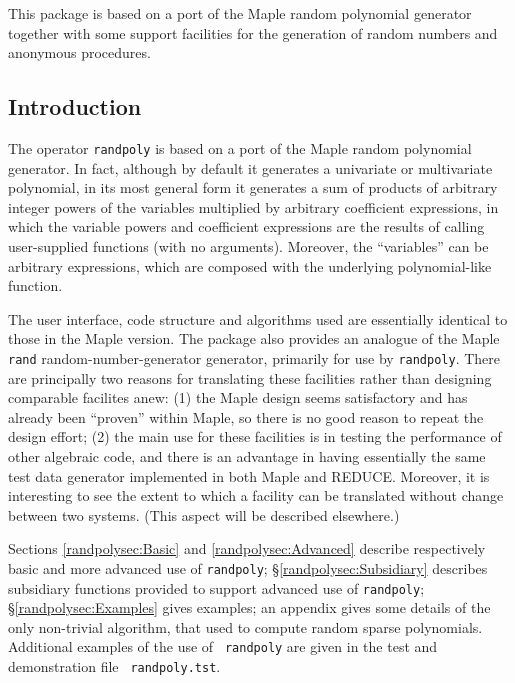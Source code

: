 

  This package is based on a port of the Maple random polynomial
  generator together with some support facilities for the generation
  of random numbers and anonymous procedures.


\subsection{Introduction}

The operator {\tt randpoly} is based on a port of the Maple random
polynomial generator.  In fact, although by default it generates a
univariate or multivariate polynomial, in its most general form it
generates a sum of products of arbitrary integer powers of the
variables multiplied by arbitrary coefficient expressions, in which
the variable powers and coefficient expressions are the results of
calling user-supplied functions (with no arguments).  Moreover, the
``variables'' can be arbitrary expressions, which are composed with
the underlying polynomial-like function.

The user interface, code structure and algorithms used are essentially
identical to those in the Maple version.  The package also provides an
analogue of the Maple {\tt rand} random-number-generator generator,
primarily for use by {\tt randpoly}.  There are principally two
reasons for translating these facilities rather than designing
comparable facilites anew: (1) the Maple design seems satisfactory and
has already been ``proven'' within Maple, so there is no good reason
to repeat the design effort; (2) the main use for these facilities is
in testing the performance of other algebraic code, and there is an
advantage in having essentially the same test data generator
implemented in both Maple and REDUCE\@.  Moreover, it is interesting
to see the extent to which a facility can be translated without change
between two systems.  (This aspect will be described elsewhere.)

Sections \ref{randpolysec:Basic} and \ref{randpolysec:Advanced} describe respectively
basic and more advanced use of {\tt randpoly}; \S\ref{randpolysec:Subsidiary}
describes subsidiary functions provided to support advanced use of
{\tt randpoly}; \S\ref{randpolysec:Examples} gives examples; an appendix gives
some details of the only non-trivial algorithm, that used to compute
random sparse polynomials.  Additional examples of the use of {\tt
randpoly} are given in the test and demonstration file {\tt
randpoly.tst}.


